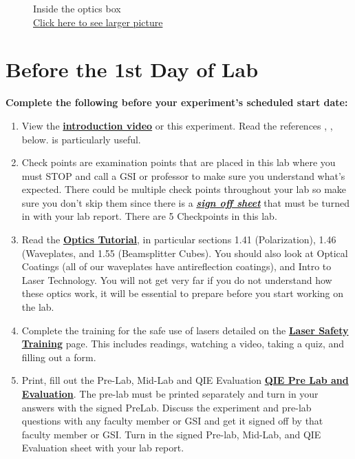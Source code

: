 \documentclass{../lab}
\begin{document}
\begin{figure}[H]
  \caption{Inside the optics box \\ \href{http://experimentationlab.berkeley.edu/sites/default/files/images/QIE_APDs_0616.jpg}{Click here to see larger picture}}\label{fig:QIE_APDs_0616.jpg}
\endminipage
\end{figure}

\section{Before the 1st Day of Lab}

\textbf{Complete the following before your experiment's scheduled start date:}

\begin{enumerate}
    \item View the\textbf{ }\href{http://experimentationlab.berkeley.edu/sites/default/files/QIE/qie\_introduction\_final2.mp4}{\textbf{introduction video}} or this experiment. Read the references \cite{Dehlinger}, \cite{Bell}, \cite{Clauser} below. \cite{Dehlinger} is particularly useful.

    \item Check points are examination points that are placed in this lab where you must STOP and call a GSI or professor to make sure you understand what's expected. There could  be multiple check points throughout your lab so make sure you don't skip them since there is a \emph{\href{http://experimentationlab.berkeley.edu/qiecheckpoints}{\textbf{sign off sheet}}} that must be turned in with your lab report. There are 5 Checkpoints in this lab.

    \item Read the \href{http://experimentationlab.berkeley.edu/sites/default/files/QIE/fundamental-Optics.pdf}{\textbf{Optics Tutorial}}, in particular sections 1.41 (Polarization), 1.46 (Waveplates, and 1.55 (Beamsplitter Cubes). You should also look at Optical Coatings (all of our waveplates have antireflection coatings), and Intro to Laser Technology. You will not get very far if you do not understand how these optics work, it will be essential to prepare before you start working on the lab.

    \item Complete the training for the safe use of lasers detailed on the \href{http://experimentationlab.berkeley.edu/lasersafety}{\textbf{\textbf{Laser Safety Training}}} page. This includes readings, watching a video, taking a quiz, and filling out a form.

    \item Print, fill out the Pre-Lab, Mid-Lab and QIE Evaluation \href{http://experimentationlab.berkeley.edu/qieprelab}{\textbf{QIE Pre Lab and Evaluation}}. The pre-lab must be printed separately and turn in your answers with the signed PreLab. Discuss the experiment and pre-lab questions with any faculty member or GSI and get it signed off by that faculty member or GSI. Turn in the signed Pre-lab, Mid-Lab, and QIE Evaluation sheet with your lab report.


\end{enumerate}
\end{document}
